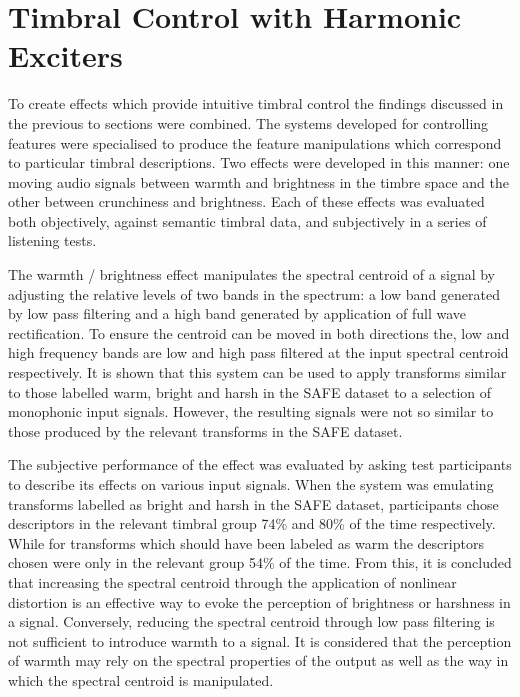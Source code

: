 \section{Timbral Control with Harmonic Exciters}
\label{sec:Conclusion-TimbralControl}
	To create effects which provide intuitive timbral control the findings discussed in the previous to sections were
	combined. The systems developed for controlling features were specialised to produce the feature manipulations which
	correspond to particular timbral descriptions. Two effects were developed in this manner: one moving audio signals
	between warmth and brightness in the timbre space and the other between crunchiness and brightness. Each of these
	effects was evaluated both objectively, against semantic timbral data, and subjectively in a series of listening
	tests.

	The warmth / brightness effect manipulates the spectral centroid of a signal by adjusting the relative levels of two
	bands in the spectrum: a low band generated by low pass filtering and a high band generated by application of full
	wave rectification. To ensure the centroid can be moved in both directions the, low and high frequency bands are low
	and high pass filtered at the input spectral centroid respectively. It is shown that this system can be used to
	apply transforms similar to those labelled warm, bright and harsh in the SAFE dataset to a selection of monophonic
	input signals. However, the resulting signals were not so similar to those produced by the relevant transforms in
	the SAFE dataset. 

	The subjective performance of the effect was evaluated by asking test participants to describe its effects on
	various input signals. When the system was emulating transforms labelled as bright and harsh in the SAFE dataset,
	participants chose descriptors in the relevant timbral group 74\% and 80\% of the time respectively. While for
	transforms which should have been labeled as warm the descriptors chosen were only in the relevant group 54\% of the
	time. From this, it is concluded that increasing the spectral centroid through the application of nonlinear
	distortion is an effective way to evoke the perception of brightness or harshness in a signal. Conversely, reducing
	the spectral centroid through low pass filtering is not sufficient to introduce warmth to a signal. It is considered
	that the perception of warmth may rely on the spectral properties of the output as well as the way in which the
	spectral centroid is manipulated.

